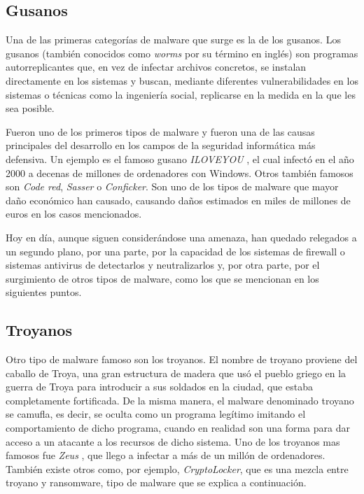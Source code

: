 \subsection{Gusanos}

Una de las primeras categorías de malware que surge es la de los gusanos. Los gusanos (también conocidos como \textit{worms} por su término en inglés) son programas autorreplicantes que, en vez de infectar archivos concretos, se instalan directamente en los sistemas y buscan, mediante diferentes vulnerabilidades en los sistemas o técnicas como la ingeniería social, replicarse en la medida en la que les sea posible.

Fueron uno de los primeros tipos de malware y fueron una de las causas principales del desarrollo en los campos de la seguridad informática más defensiva. Un ejemplo es el famoso gusano \emph{ILOVEYOU} \cite{top-10-viruses}, el cual infectó en el año 2000 a decenas de millones de ordenadores con Windows. Otros también famosos son \emph{Code red}, \emph{Sasser} o \emph{Conficker}. Son uno de los tipos de malware que mayor daño económico han causado, causando daños estimados en miles de millones de euros en los casos mencionados.

Hoy en día, aunque siguen considerándose una amenaza, han quedado relegados a un segundo plano, por una parte, por la capacidad de los sistemas de firewall o sistemas antivirus de detectarlos y neutralizarlos y, por otra parte, por el surgimiento de otros tipos de malware, como los que se mencionan en los siguientes puntos.

\subsection{Troyanos}

Otro tipo de malware famoso son los troyanos. El nombre de troyano proviene del caballo de Troya, una gran estructura de madera que usó el pueblo griego en la guerra de Troya para introducir a sus soldados en la ciudad, que estaba completamente fortificada. De la misma manera, el malware denominado troyano se camufla, es decir, se oculta como un programa legítimo imitando el comportamiento de dicho programa, cuando en realidad son una forma para dar acceso a un atacante a los recursos de dicho sistema. Uno de los troyanos mas famosos fue \emph{Zeus} \cite{top-10-viruses}, que llego a infectar a más de un millón de ordenadores. También existe otros como, por ejemplo, \emph{CryptoLocker}, que es una mezcla entre troyano y ransomware, tipo de malware que se explica a continuación.

